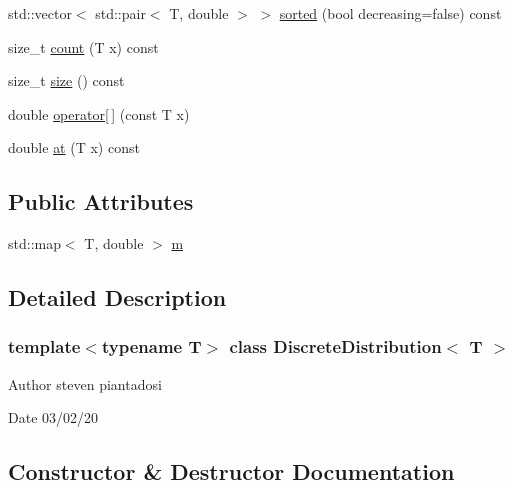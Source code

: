 \begin{DoxyCompactItemize}
\item 
std\+::vector$<$ std\+::pair$<$ T, double $>$ $>$ \hyperlink{class_discrete_distribution_a94488cfd094f6cde47f15a1f4c7cdbb9}{sorted} (bool decreasing=false) const
\item 
size\+\_\+t \hyperlink{class_discrete_distribution_afd3fd83dc776f5616e826de18093328b}{count} (T x) const
\item 
size\+\_\+t \hyperlink{class_discrete_distribution_ad74207d32c2ed6c5c26b3f991f4fedba}{size} () const
\item 
double \hyperlink{class_discrete_distribution_a374bcf1a5b302e6ac618afe9d78e265f}{operator\mbox{[}$\,$\mbox{]}} (const T x)
\item 
double \hyperlink{class_discrete_distribution_acb11f1cfbf4ef039c538f06cde8249fd}{at} (T x) const
\end{DoxyCompactItemize}
\subsection*{Public Attributes}
\begin{DoxyCompactItemize}
\item 
std\+::map$<$ T, double $>$ \hyperlink{class_discrete_distribution_a72a09b5b79a5bf0c55f780b9a81271fb}{m}
\end{DoxyCompactItemize}


\subsection{Detailed Description}
\subsubsection*{template$<$typename T$>$\newline
class Discrete\+Distribution$<$ T $>$}

\begin{DoxyAuthor}{Author}
steven piantadosi 
\end{DoxyAuthor}
\begin{DoxyDate}{Date}
03/02/20 
\end{DoxyDate}


\subsection{Constructor \& Destructor Documentation}
\mbox{\label{class_discrete_distribution_a8ffb7c55f85cf42af7aec6deb97ec4ab}} 
